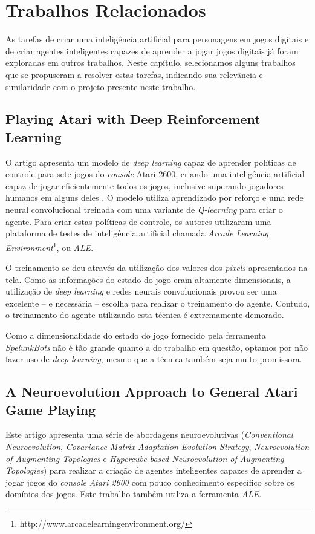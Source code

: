 \chapter{\label{chap:related-work}Trabalhos Relacionados}
As tarefas de criar uma inteligência artificial para personagens em jogos
digitais e de criar agentes inteligentes capazes de aprender a jogar jogos
digitais já foram exploradas em outros trabalhos. Neste capítulo, selecionamos
alguns trabalhos que se propuseram a resolver estas tarefas, indicando sua
relevância e similaridade com o projeto presente neste trabalho. 


\section{Playing Atari with Deep Reinforcement Learning}
O artigo apresenta um modelo de \textit{deep learning} capaz de aprender
políticas de controle para sete jogos do \textit{console} Atari 2600, criando
uma inteligência artificial capaz de jogar eficientemente todos os jogos,
inclusive superando jogadores humanos em alguns deles
\cite{DBLP:journals/corr/MnihKSGAWR13}. O modelo utiliza aprendizado por reforço
e uma rede neural convolucional treinada com uma variante de \textit{Q-learning}
para criar o agente. Para criar estas políticas de controle, os autores
utilizaram uma plataforma de testes de inteligência artificial chamada
\textit{Arcade Learning
Environment}\footnote{http://www.arcadelearningenvironment.org/}, ou
\textit{ALE}.

O treinamento se deu através da utilização dos valores dos \textit{pixels}
apresentados na tela. Como as informações do estado do jogo eram altamente
dimensionais, a utilização de \textit{deep learning} e redes neurais
convolucionais provou ser uma excelente -- e necessária -- escolha para realizar
o treinamento do agente. Contudo, o treinamento do agente utilizando esta
técnica é extremamente demorado.

Como a dimensionalidade do estado do jogo fornecido pela ferramenta
\textit{SpelunkBots} não é tão grande quanto a do trabalho em questão, optamos
por não fazer uso de \textit{deep learning}, mesmo que a técnica também seja
muito promissora.


\section{A Neuroevolution Approach to General Atari Game Playing}
Este artigo \cite{NeuroEvolutionAtari} apresenta uma série de abordagens
neuroevolutivas (\textit{Conventional Neuroevolution}, \textit{Covariance Matrix
Adaptation Evolution Strategy}, \textit{Neuroevolution of Augmenting Topologies}
e \textit{Hypercube-based Neuroevolution of Augmenting Topologies}) para
realizar a criação de agentes inteligentes capazes de aprender a jogar jogos do
\textit{console} \textit{Atari 2600} com pouco conhecimento específico sobre os
domínios dos jogos. Este trabalho também utiliza a ferramenta \textit{ALE}.

